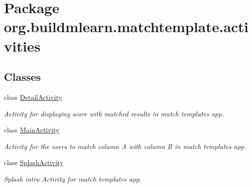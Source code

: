 \hypertarget{namespaceorg_1_1buildmlearn_1_1matchtemplate_1_1activities}{}\section{Package org.\+buildmlearn.\+matchtemplate.\+activities}
\label{namespaceorg_1_1buildmlearn_1_1matchtemplate_1_1activities}
\subsection*{Classes}
\begin{DoxyCompactItemize}
\item 
class \hyperlink{classorg_1_1buildmlearn_1_1matchtemplate_1_1activities_1_1DetailActivity}{Detail\+Activity}
\begin{DoxyCompactList}\small\item\em Activity for displaying score with matched results in match template\textquotesingle{}s app. \end{DoxyCompactList}\item 
class \hyperlink{classorg_1_1buildmlearn_1_1matchtemplate_1_1activities_1_1MainActivity}{Main\+Activity}
\begin{DoxyCompactList}\small\item\em Activity for the users to match column A with column B in match template\textquotesingle{}s app. \end{DoxyCompactList}\item 
class \hyperlink{classorg_1_1buildmlearn_1_1matchtemplate_1_1activities_1_1SplashActivity}{Splash\+Activity}
\begin{DoxyCompactList}\small\item\em Splash intro Activity for match template\textquotesingle{}s app. \end{DoxyCompactList}\end{DoxyCompactItemize}
